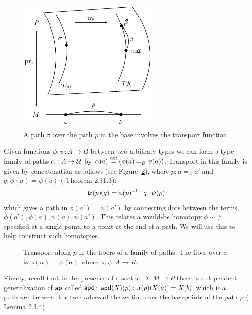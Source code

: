 \begin{figure}[H]
\centering
\includegraphics[width=200pt]{figs/pathovers.pdf}
\caption{A path \( \pi \) over the path \( p \) in the base involves the transport function.}
\label{fig:pathovers}
\end{figure}

Given functions \( \phi,\psi:A\to B \) between two arbitrary types we can form a type family of paths \( \alpha:A\to\mathcal{U} \) by \( \alpha(a)\stackrel{\mathrm{def}}{=}(\phi(a)=_B\psi(a)) \). Transport in this family is given by concatenation as follows (see Figure~\ref{fig:transport_family_of_paths}), where \( p:a=_A a' \) and \( q:\phi(a)=\psi(a) \) (\cite{hottbook} Theorem 2.11.3):
\[ 
\mathsf{tr}(p)(q) = \phi(p)^{-1}\cdot q\cdot \psi(p)
\]
which gives a path in \( \phi(a')=\psi(a') \) by connecting dots between the terms \( \phi(a'), \phi(a), \psi(a), \psi(a') \). This relates a would-be homotopy \( \phi\sim\psi \) specified at a single point, to a point at the end of a path. We will use this to help construct such homotopies.
\begin{figure}[h]
\centering
{}
\caption{Transport along \( p \) in the fibers of a family of paths. The fiber over \( a \) is \( \phi(a)=\psi(a) \) where \( \phi,\psi:A\to B \).}
\label{fig:transport_family_of_paths}
\end{figure}

Finally, recall that in the presence of a section \( X:M\to P \) there is a dependent generalization of \( \mathsf{ap} \) called \( \mathsf{apd} \): \( \mathsf{apd}(X)(p):\mathsf{tr}(p)(X(a))=X(b) \) which is a pathover between the two values of the section over the basepoints of the path \( p \) (\cite{hottbook} Lemma 2.3.4).
